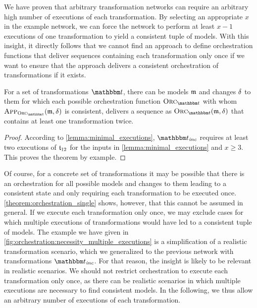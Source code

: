 We have proven that arbitrary transformation networks can require an arbitrary high number of executions of each transformation.
By selecting an appropriate $x$ in the example network, we can force the network to perform at least $x-1$ executions of one transformation to yield a consistent tuple of models.
With this insight, it directly follows that we cannot find an approach to define orchestration functions that deliver sequences containing each transformation only once if we want to ensure that the approach delivers a consistent orchestration of transformations if it exists. 

\begin{theorem}
    \label{theorem:orchestration_single}
    For a set of transformations $\transformationset{T}$, there can be models $\modeltuple{m}$ and changes $\mathfrak{\delta}_{}$ to them for which each possible orchestration function $\orcfunction{\transformationset{T}}$ with whom $\appfunction{\orcfunction{\transformationset{T}}}(\modeltuple{m}, \changetuple{})$ is consistent, delivers a sequence as $\orcfunction{\transformationset{T}}(\modeltuple{m}, \changetuple{})$ that contains at least one transformation twice.
\end{theorem}
\begin{proof}
    According to \autoref{lemma:minimal_executions}, $\transformationset{T}_\mathvariable{inc}$ requires at least two executions of $\transformation{t}_{12}$ for the inputs in \autoref{lemma:minimal_executions} and $x \geq 3$.
    This proves the theorem by example.
\end{proof}

Of course, for a concrete set of transformations it may be possible that there is an orchestration for all possible models and changes to them leading to a consistent state and only requiring each transformation to be executed once.
\autoref{theorem:orchestration_single} shows, however, that this cannot be assumed in general.
If we execute each transformation only once, we may exclude cases for which multiple executions of transformations would have led to a consistent tuple of models.
The example we have given in \autoref{fig:orchestration:necessity_multiple_executions} is a simplification of a realistic transformation scenario, which we generalized to the previous network with transformations $\transformationset{T}_\mathvariable{inc}$.
For that reason, the insight is likely to be relevant in realistic scenarios.
We should not restrict orchestration to execute each transformation only once, as there can be realistic scenarios in which multiple executions are necessary to find consistent models.
In the following, we thus allow an arbitrary number of executions of each transformation.

